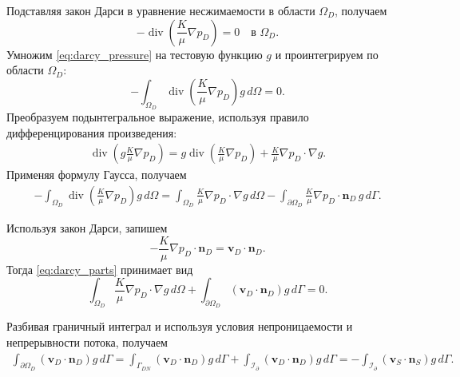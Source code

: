 \documentclass[a4paper,14pt]{extarticle}
\begin{document}
Подставляя закон Дарси в уравнение несжимаемости в области
$\Omega_D$, получаем
\begin{equation}
	-\operatorname{div}
	\left(
		\frac{K}{\mu}\nabla p_D
	\right)
	=
	0
	\quad\text{в }\Omega_D.
	\label{eq:darcy_pressure}
\end{equation}
Умножим \eqref{eq:darcy_pressure} на тестовую функцию $g$
и проинтегрируем по области $\Omega_D$:
\begin{equation}
	-\int_{\Omega_D}
	\operatorname{div}
	\left(
		\frac{K}{\mu}\nabla p_D
	\right)
	g\,d\Omega
	=
	0.
	\label{eq:darcy_integral}
\end{equation}
Преобразуем подынтегральное выражение, используя правило
дифференцирования произведения:
\begin{equation}
	\begin{gathered}
		\operatorname{div}
		\left(
			g\frac{K}{\mu}\nabla p_D
		\right)
		=
		g\operatorname{div}
		\left(
			\frac{K}{\mu}\nabla p_D
		\right)
		+
		\frac{K}{\mu}\nabla p_D\cdot\nabla g.
	\end{gathered}
\end{equation}
Применяя формулу Гаусса,
получаем
\begin{equation}
	\begin{gathered}
		-\int_{\Omega_D}
		\operatorname{div}
		\left(
			\frac{K}{\mu}\nabla p_D
		\right)
		g\,d\Omega
		=
		\int_{\Omega_D}
		\frac{K}{\mu}\nabla p_D\cdot\nabla g\,d\Omega
		-
		\int_{\partial\Omega_D}
		\frac{K}{\mu}\nabla p_D\cdot\mathbf n_D
		\,g\,d\Gamma.
	\end{gathered}
	\label{eq:darcy_integration_by_parts}
\end{equation}

Используя закон Дарси, запишем
\begin{equation}
	-\frac{K}{\mu}\nabla p_D\cdot\mathbf n_D
	=
	\mathbf v_D\cdot\mathbf n_D.
\end{equation}
Тогда \eqref{eq:darcy_parts} принимает вид
\begin{equation}
	\int_{\Omega_D}
	\frac{K}{\mu}\nabla p_D\cdot\nabla g\,d\Omega
	+
	\int_{\partial\Omega_D}
	(\mathbf v_D\cdot\mathbf n_D)g\,d\Gamma
	=
	0.
	\label{eq:darcy_boundary_flux}
\end{equation}

Разбивая граничный интеграл и используя условия
непроницаемости и непрерывности потока, получаем
\begin{equation}
	\begin{gathered}
		\int_{\partial\Omega_D}
		(\mathbf v_D\cdot\mathbf n_D)g\,d\Gamma
		=
		\int_{\Gamma_{DN}}
		(\mathbf v_D\cdot\mathbf n_D)g\,d\Gamma
		+
		\int_{\mathcal I_\partial}
		(\mathbf v_D\cdot\mathbf n_D)g\,d\Gamma
		=
		-
		\int_{\mathcal I_\partial}
		(\mathbf v_S\cdot\mathbf n_S)g\,d\Gamma.
	\end{gathered}
\end{equation}
\end{document}
